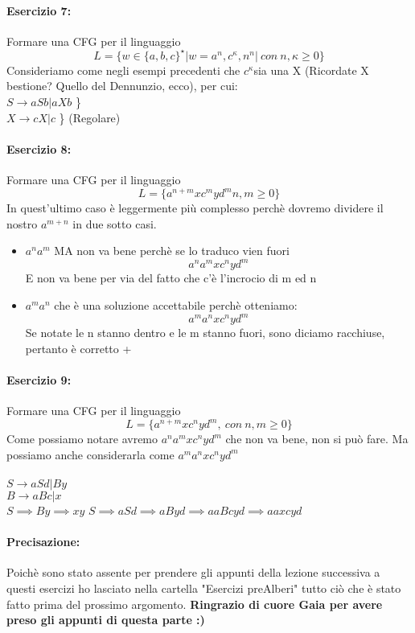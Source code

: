 \documentclass[12pt, a4paper, openany, oneside]{book}
\begin{document}
\paragraph{Esercizio 7: }Formare una CFG per il linguaggio \\
$$L = \{ w\in \{a,b,c\}^{\star} | w = a^{n}, c^{\kappa}, n^{n}
| ~ con ~ n, \kappa \geq 0 \}$$
Consideriamo come negli esempi precedenti che $c^{\kappa} $sia una X (Ricordate 
X bestione? Quello del Dennunzio, ecco), per cui: \\
$S \to aSb | aXb$ \} \\
$X \to cX | c$ \} (Regolare)\\
\paragraph{Esercizio 8: }Formare una CFG per il linguaggio \\
$$L = \{ a^{n+m} x c^{m} y d^{m} n, m \geq 0 \}$$
In quest'ultimo caso è leggermente più complesso perchè dovremo dividere 
il nostro $a^{m+n}$ in due sotto casi.
\begin{itemize}
	\item $a^{n}a^{m}$ MA non va bene perchè se lo traduco vien fuori 
	$$a^{n}a^{m} x c^{n}yd^{m}$$
	E non va bene per via del fatto che c'è l'incrocio di m ed n
	\item $a^{m}a^{n}$ che è una soluzione accettabile perchè otteniamo:
	$$a^{m}a^{n} x c^{n}y d^{m}$$ Se notate le n stanno dentro e le m stanno 
	fuori, sono diciamo racchiuse, pertanto è corretto +
\end{itemize}

\paragraph{Esercizio 9: }Formare una CFG per il linguaggio \\
$$L = \{ a^{n+m}xc^{n}yd^{m}, ~con~n,m \geq 0 \}$$
Come possiamo notare avremo $a^{n}a^{m}xc^{n}yd^{m}$ che non va bene, non si 
può fare. Ma possiamo anche considerarla come $a^{m}a^{n}xc^{n}yd^{m}$ \\ \\
$S \to aSd | By$ \\
$B \to aBc | x$ \\
$S \implies By \implies xy$
$S \implies aSd \implies aByd \implies aaBcyd \implies aaxcyd$

\paragraph{Precisazione: } Poichè sono stato assente per prendere gli appunti
della lezione successiva a questi esercizi ho lasciato nella cartella "Esercizi
preAlberi" tutto ciò che è stato fatto prima del prossimo argomento. \textbf{
Ringrazio di cuore Gaia per avere preso gli appunti di questa parte :)}
\end{document}
